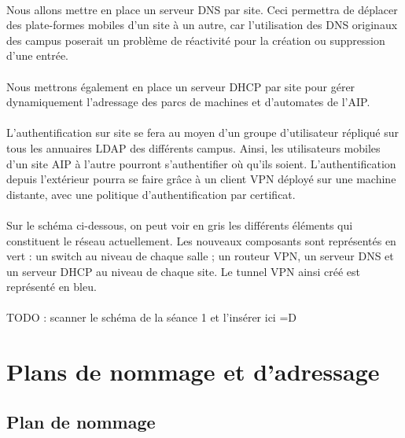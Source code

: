 \documentclass[a4paper]{article}
\begin{document}
	\paragraph*{} %
	Nous allons mettre en place un serveur DNS par site. Ceci permettra de déplacer des plate-formes mobiles d'un site à un autre, car l'utilisation des DNS originaux des campus poserait un problème de réactivité pour la création ou suppression d'une entrée. 
	
	\paragraph*{} %
	Nous mettrons également en place un serveur DHCP par site pour gérer dynamiquement l'adressage des parcs de machines et d'automates de l'AIP. 
	
	\paragraph*{} %
	L'authentification sur site se fera au moyen d'un groupe d'utilisateur répliqué sur tous les annuaires LDAP des différents campus. Ainsi, les utilisateurs mobiles d'un site AIP à l'autre pourront s'authentifier où qu'ils soient. L'authentification depuis l'extérieur pourra se faire grâce à un client VPN déployé sur une machine distante, avec une politique d'authentification par certificat. 
	
	\paragraph*{} %
	Sur le schéma ci-dessous, on peut voir en gris les différents éléments qui constituent le réseau actuellement. Les nouveaux composants sont représentés en vert : un switch au niveau de chaque salle ; un routeur VPN, un serveur DNS et un serveur DHCP au niveau de chaque site. Le tunnel VPN ainsi créé est représenté en bleu. 
	
	\paragraph*{} %
	TODO : scanner le schéma de la séance 1 et l'insérer ici =D 

	
\section{Plans de nommage et d'adressage}
	\subsection{Plan de nommage}
\end{document}
